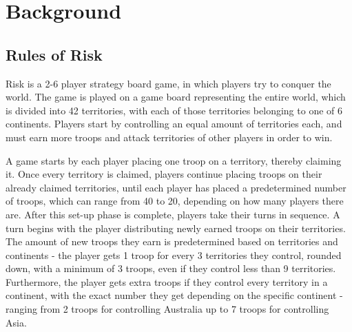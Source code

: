 \graphicspath{ {./Images/} }
\chapter{Background}
\section{Rules of Risk}
\label{rulesOfRisk}
Risk \cite{riskrules} is a 2-6 player strategy board game, in which players try to conquer the world. The game is played on a game board representing the entire world, which is divided into 42 territories, with each of those territories belonging to one of 6 continents. Players start by controlling an equal amount of territories each, and must earn more troops and attack territories of other players in order to win.

A game starts by each player placing one troop on a territory, thereby claiming it. Once every territory is claimed, players continue placing troops on their already claimed territories, until each player has placed a predetermined number of troops, which can range from 40 to 20, depending on how many players there are. After this set-up phase is complete, players take their turns in sequence. A turn begins with the player distributing newly earned troops on their territories. The amount of new troops they earn is predetermined based on territories and continents - the player gets 1 troop for every 3 territories they control, rounded down, with a minimum of 3 troops, even if they control less than 9 territories. Furthermore, the player gets extra troops if they control every territory in a continent, with the exact number they get depending on the specific continent - ranging from 2 troops for controlling Australia up to 7 troops for controlling Asia.


